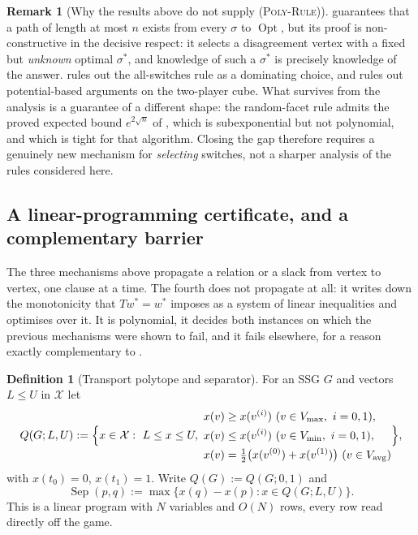 \documentclass[11pt]{article}
\theoremstyle{plain}
\theoremstyle{definition}
\newtheorem{definition}[theorem]{Definition}
\newtheorem{remark}[theorem]{Remark}
\DeclareMathOperator{\Opt}{Opt}
\newcommand{\Vmax}{V_{\max}}
\newcommand{\Vmin}{V_{\min}}
\newcommand{\Vavg}{V_{\mathrm{avg}}}
\begin{document}
\begin{remark}[Why the results above do not supply \textsc{(Poly-Rule)}]
 guarantees that a path of length at most $n$
exists from every $\sigma$ to $\Opt$, but its proof is
non-constructive in the decisive respect: it selects a disagreement
vertex with a fixed but \emph{unknown} optimal $\sigma^\ast$, and
knowledge of such a $\sigma^\ast$ is precisely knowledge of the answer.
 rules out the all-switches rule as a
dominating choice, and  rules out potential-based
arguments on the two-player cube. What survives from the analysis is a
guarantee of a different shape: the random-facet rule admits the proved
expected bound $e^{2\sqrt n}$ of , which is
subexponential but not polynomial, and which is tight for that algorithm.
Closing the gap therefore requires a genuinely new mechanism for
\emph{selecting} switches, not a sharper analysis of the rules considered
here.
\end{remark}

\subsection{A linear-programming certificate, and a complementary
barrier}\label{sec:transport}

The three mechanisms above propagate a relation or a slack from vertex to
vertex, one clause at a time. The fourth does not propagate at all: it
writes down the monotonicity that $Tw^\ast=w^\ast$ imposes as a system of
linear inequalities and optimises over it. It is polynomial, it decides
both instances on which the previous mechanisms were shown to fail, and
it fails elsewhere, for a reason exactly complementary to
.

\begin{definition}[Transport polytope and separator]\label{def:transport}
For an SSG $G$ and vectors $L\le U$ in $\mathcal X$ let
\[
  Q(G;L,U):=\Bigl\{x\in\mathcal X:\ L\le x\le U,\
  \begin{aligned}
   &x(v)\ge x(v^{(i)})\ (v\in\Vmax,\ i=0,1),\\
   &x(v)\le x(v^{(i)})\ (v\in\Vmin,\ i=0,1),\\
   &x(v)=\tfrac12\bigl(x(v^{(0)})+x(v^{(1)})\bigr)\ (v\in\Vavg)
  \end{aligned}\Bigr\},
\]
with $x(t_0)=0$, $x(t_1)=1$. Write $Q(G):=Q(G;0,1)$ and
\[
  \operatorname{Sep}(p,q):=\max\{x(q)-x(p):x\in Q(G;L,U)\}.
\]
This is a linear program with $N$ variables and $O(N)$ rows, every row
read directly off the game.
\end{definition}
\end{document}

